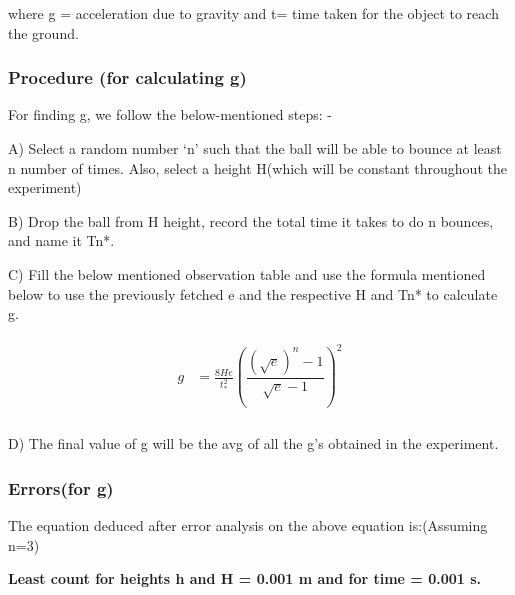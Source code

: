 \documentclass[11pt]{scrartcl} %
\begin{document}
where g = acceleration due to gravity and t= time taken for the object to reach the ground. \par

\subsubsection{Procedure (for calculating g)}
For finding g, we follow the below-mentioned steps: - \par

A) Select a random number ‘n’ such that the ball will be able to bounce at least n number of times. Also, select a height H(which will be constant throughout the experiment)\par

B) Drop the ball from H height, record the total time it takes to do n bounces, and name it Tn*. \par

C) Fill the below mentioned observation table and use the formula mentioned below to use the previously fetched e and the respective H and Tn* to calculate g. \par
\begin{align} 
	\begin{split}
		g &= \frac{8He}{t_{*}^{2}}\left(\dfrac{(\sqrt{e})^n-1}{\sqrt{e}-1}\right)^2\\
	\end{split}					
\end{align}
	 
D) The final value of g will be the avg of all the g’s obtained in the experiment. \par

\subsubsection{Errors(for g)}
The equation deduced after error analysis on the above equation is:(Assuming n=3)\par
\textbf{Least count for heights h and H = 0.001 m and for time = 0.001 s.}\par
\end{document}
